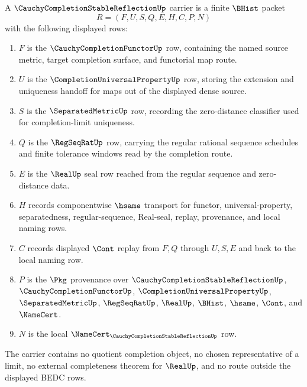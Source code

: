 \begin{definition}
\label{def:cauchy-completion-stable-reflection-carrier}
A $\CauchyCompletionStableReflectionUp$ carrier is a finite $\BHist$ packet
$$
R=(F,U,S,Q,E,H,C,P,N)
$$
with the following displayed rows:
\begin{enumerate}
\item $F$ is the $\CauchyCompletionFunctorUp$ row, containing the named source metric, target completion surface, and functorial map route.
\item $U$ is the $\CompletionUniversalPropertyUp$ row, storing the extension and uniqueness handoff for maps out of the displayed dense source.
\item $S$ is the $\SeparatedMetricUp$ row, recording the zero-distance classifier used for completion-limit uniqueness.
\item $Q$ is the $\RegSeqRatUp$ row, carrying the regular rational sequence schedules and finite tolerance windows read by the completion route.
\item $E$ is the $\RealUp$ seal row reached from the regular sequence and zero-distance data.
\item $H$ records componentwise $\hsame$ transport for functor, universal-property, separatedness, regular-sequence, Real-seal, replay, provenance, and local naming rows.
\item $C$ records displayed $\Cont$ replay from $F,Q$ through $U,S,E$ and back to the local naming row.
\item $P$ is the $\Pkg$ provenance over $\CauchyCompletionStableReflectionUp$, $\CauchyCompletionFunctorUp$, $\CompletionUniversalPropertyUp$, $\SeparatedMetricUp$, $\RegSeqRatUp$, $\RealUp$, $\BHist$, $\hsame$, $\Cont$, and $\NameCert$.
\item $N$ is the local $\NameCert_{\CauchyCompletionStableReflectionUp}$ row.
\end{enumerate}
The carrier contains no quotient completion object, no chosen representative of a limit, no external completeness theorem for $\RealUp$, and no route outside the displayed BEDC rows.
\end{definition}

